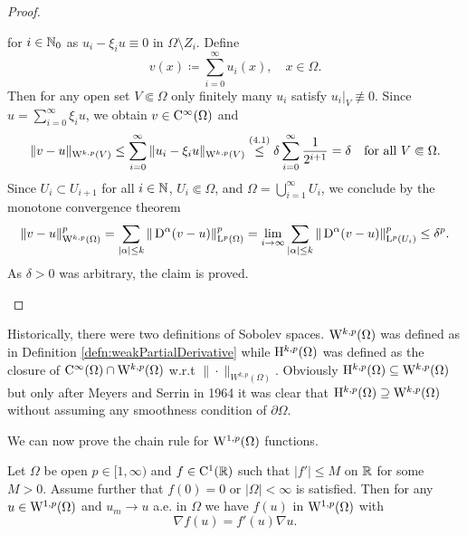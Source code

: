 \begin{proof}
\begin{enumerate}[i)]
\begin{equation}
    \end{equation}
    for $i \in \mathbb{N}_0$ as $u_i - \xi_i u \equiv 0$ in $\Omega \setminus Z_i$.
    Define
    $$
    v(x) \coloneqq \sum_{i = 0}^\infty u_i(x), \quad x \in \Omega.
    $$
    Then for any open set $V \Subset \Omega$ only finitely many $u_i$ satisfy $u_i|_V \not\equiv 0$.
    Since $u = \sum_{i = 0}^\infty \xi_i u$, we obtain $v \in \mathrm{C}^\infty(\Omega)$ and
    $$
    \|v - u\|_{\mathrm{W}^{k,p}(V)}
    \leq \sum_{i = 0}^\infty \|u_i - \xi_i u\|_{\mathrm{W}^{k,p}(V)}
    \overset{(4.1)}{\leq} \delta \sum_{i = 0}^\infty \frac{1}{2^{i + 1}} 
    = \delta \quad\text{for all } V \Subset \Omega.
    $$
    Since $U_i \subset U_{i + 1}$ for all $i \in \mathbb{N}$, $U_i \Subset \Omega$, and $\Omega = \bigcup_{i = 1}^\infty U_i$, we conclude by the monotone convergence theorem
    $$
    \|v - u\|_{\mathrm{W}^{k,p}(\Omega)}^p
    = \sum_{|\alpha| \leq k} \|\,{\operatorname{D}}^\alpha (v - u) \|_{\mathrm{L}^p(\Omega)}^p
    = \lim_{i \to \infty} \sum_{|\alpha| \leq k} \|\,{\operatorname{D}}^\alpha(v - u) \|_{\mathrm{L}^p(U_i)}^p
    \leq \delta^p.
    $$
    As $\delta > 0$ was arbitrary, the claim is proved. \qedhere
\end{enumerate}
\end{proof}

\begin{rem}
  Historically, there were two definitions of Sobolev spaces.
  $\mathrm{W}^{k,p}(\Omega)$ was defined as in Definition \ref{defn:weakPartialDerivative} while $\mathrm{H}^{k,p}(\Omega)$ was defined as the closure of $\mathrm{C}^\infty(\Omega) \cap \mathrm{W}^{k,p}(\Omega)$ w.r.t $\|\cdot\|_{W^{k,p}(\Omega)}$.
  Obviously $\mathrm{H}^{k,p}(\Omega) \subseteq \mathrm{W}^{k,p}(\Omega)$ but only after Meyers and Serrin in 1964 \cite{meyers1964} it was clear that $\mathrm{H}^{k,p}(\Omega) \supseteq \mathrm{W}^{k,p}(\Omega)$ without assuming any smoothness condition of $\partial \Omega$.
\end{rem}

We can now prove the chain rule for $\mathrm{W}^{1,p}(\Omega)$ functions.

\begin{prop}
  Let $\Omega$ be open $p \in [1,\infty)$ and $f \in \mathrm{C}^1(\mathbb{R})$ such that $|f'| \leq M$ on $\mathbb{R}$ for some $M > 0$.
  Assume further that $f(0) = 0$ or $|\Omega| < \infty$ is satisfied.
  Then for any $u \in \mathrm{W}^{1,p}(\Omega)$ and $u_m \to u$ a.e. in $\Omega$ we have $f(u)$ in $\mathrm{W}^{1,p}(\Omega)$ with $$\nabla f(u) = f'(u) \nabla u.$$
\end{prop}

